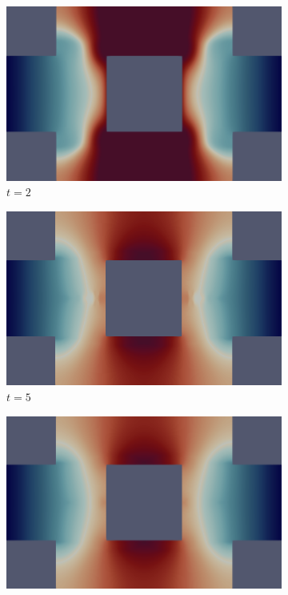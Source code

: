 \begin{figure}[H]
    \centering
    \caption{Heat sink problem: State Solution}
    \begin{subfigure}{.4\textwidth}
        \includegraphics[width=\textwidth]{imgs/HeatSink_Solution/first.png}
        \caption{$t = 2$}
    \end{subfigure}
    \begin{subfigure}{.4\textwidth}
        \includegraphics[width=\textwidth]{imgs/HeatSink_Solution/second.png}
        \caption{$t = 5$}
    \end{subfigure}
    \begin{subfigure}{.4\textwidth}
        \includegraphics[width=\textwidth]{imgs/HeatSink_Solution/third.png}

\end{subfigure}
\end{figure}
